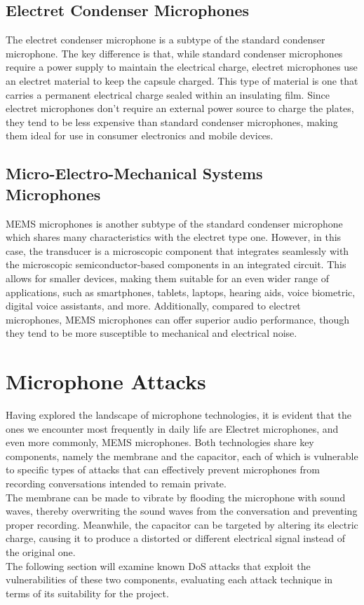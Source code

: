 \subsection{Electret Condenser Microphones}
The electret condenser microphone is a subtype of the standard condenser microphone.
The key difference is that, while standard condenser microphones require a power supply to maintain the electrical charge, electret microphones use an electret material to keep the capsule charged.
This type of material is one that carries a permanent electrical charge sealed within an insulating film.
Since electret microphones don’t require an external power source to charge the plates, they tend to be less expensive than standard condenser microphones, making them ideal for use in consumer electronics and mobile devices.
\subsection{Micro-Electro-Mechanical Systems Microphones}
MEMS microphones is another subtype of the standard condenser microphone which shares many characteristics with the electret type one.
However, in this case, the transducer is a microscopic component that integrates seamlessly with the microscopic semiconductor-based components in an integrated circuit.
This allows for smaller devices, making them suitable for an even wider range of applications, such as smartphones, tablets, laptops, hearing aids, voice biometric, digital voice assistants, and more.
Additionally, compared to electret microphones, MEMS microphones can offer superior audio performance, though they tend to be more susceptible to mechanical and electrical noise.

\section{Microphone Attacks}
Having explored the landscape of microphone technologies, it is evident that the ones we encounter most frequently in daily life are Electret microphones, and even more commonly, MEMS microphones.
Both technologies share key components, namely the membrane and the capacitor, each of which is vulnerable to specific types of attacks that can effectively prevent microphones from recording conversations intended to remain private. \\
The membrane can be made to vibrate by flooding the microphone with sound waves, thereby overwriting the sound waves from the conversation and preventing proper recording.
Meanwhile, the capacitor can be targeted by altering its electric charge, causing it to produce a distorted or different electrical signal instead of the original one.\\
The following section will examine known DoS attacks that exploit the vulnerabilities of these two components, evaluating each attack technique in terms of its suitability for the project.
